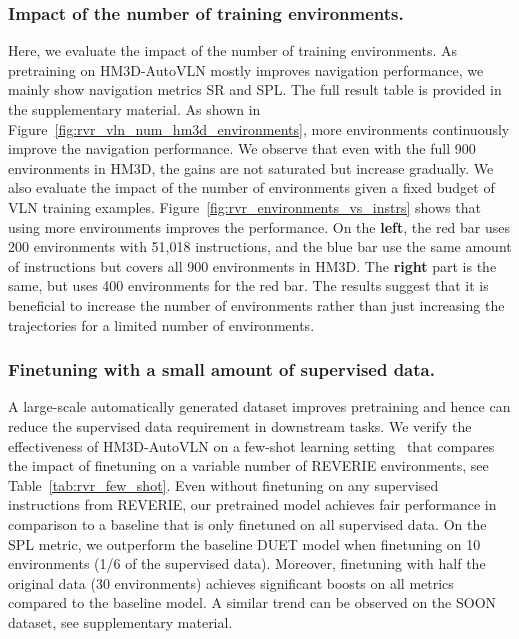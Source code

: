 \subsubsection{Impact of the number of training environments.}
Here, we evaluate the impact of the number of training environments. 
As pretraining on HM3D-AutoVLN mostly improves navigation performance, we mainly show navigation metrics SR and SPL. The full result table is provided in the supplementary material.
As shown in Figure~\ref{fig:rvr_vln_num_hm3d_environments}, more environments continuously improve the navigation performance.
We observe that even with the full 900 environments in HM3D, the gains are not saturated but increase gradually.
We also evaluate the impact of the number of environments given a fixed budget of VLN training examples.
Figure~\ref{fig:rvr_environments_vs_instrs} shows that using more environments improves the performance. 
On the \textbf{left}, the red bar uses 200 environments with 51,018 instructions, and the blue bar use the same amount of instructions but covers all 900 environments in HM3D. The \textbf{right} part is the same, but uses 400 environments for the red bar. 
The results suggest that it is beneficial to increase the number of environments rather than just increasing the trajectories for a limited number of environments. 



\subsubsection{Finetuning with a small amount of supervised data.}
A large-scale automatically generated dataset improves pretraining and hence can reduce the supervised data requirement in downstream tasks.
We verify the effectiveness of HM3D-AutoVLN on a few-shot learning setting~\cite{guhur2021airbert} that compares the impact of finetuning on a variable number of REVERIE environments, see Table~\ref{tab:rvr_few_shot}.
Even without finetuning on any supervised instructions from REVERIE, our pretrained model achieves fair performance in comparison to a baseline that is only finetuned on all supervised data.
On the SPL metric, we outperform the baseline DUET model when finetuning on 10 environments (1/6 of the supervised data).
Moreover, finetuning with half the original data (30 environments) achieves significant boosts on all metrics compared to the baseline model.
A similar trend can be observed on the SOON dataset, see supplementary material.

